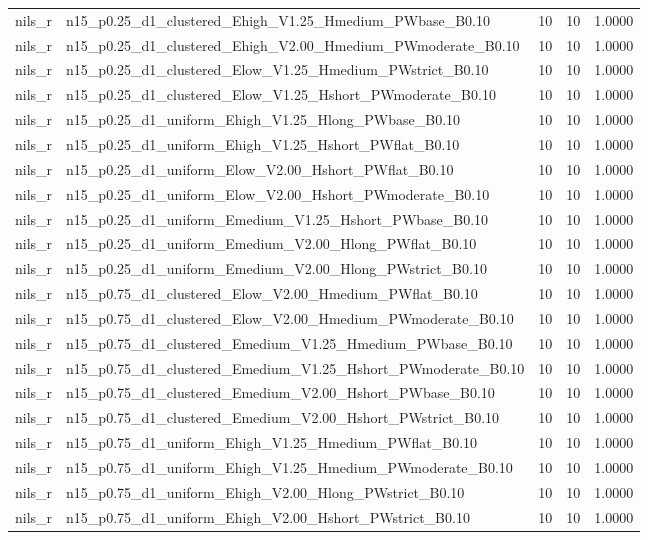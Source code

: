 \begin{tabular}{llrrr}
nils_r & n15_p0.25_d1_clustered_Ehigh_V1.25_Hmedium_PWbase_B0.10 & 10 & 10 & 1.0000 \\
nils_r & n15_p0.25_d1_clustered_Ehigh_V2.00_Hmedium_PWmoderate_B0.10 & 10 & 10 & 1.0000 \\
nils_r & n15_p0.25_d1_clustered_Elow_V1.25_Hmedium_PWstrict_B0.10 & 10 & 10 & 1.0000 \\
nils_r & n15_p0.25_d1_clustered_Elow_V1.25_Hshort_PWmoderate_B0.10 & 10 & 10 & 1.0000 \\
nils_r & n15_p0.25_d1_uniform_Ehigh_V1.25_Hlong_PWbase_B0.10 & 10 & 10 & 1.0000 \\
nils_r & n15_p0.25_d1_uniform_Ehigh_V1.25_Hshort_PWflat_B0.10 & 10 & 10 & 1.0000 \\
nils_r & n15_p0.25_d1_uniform_Elow_V2.00_Hshort_PWflat_B0.10 & 10 & 10 & 1.0000 \\
nils_r & n15_p0.25_d1_uniform_Elow_V2.00_Hshort_PWmoderate_B0.10 & 10 & 10 & 1.0000 \\
nils_r & n15_p0.25_d1_uniform_Emedium_V1.25_Hshort_PWbase_B0.10 & 10 & 10 & 1.0000 \\
nils_r & n15_p0.25_d1_uniform_Emedium_V2.00_Hlong_PWflat_B0.10 & 10 & 10 & 1.0000 \\
nils_r & n15_p0.25_d1_uniform_Emedium_V2.00_Hlong_PWstrict_B0.10 & 10 & 10 & 1.0000 \\
nils_r & n15_p0.75_d1_clustered_Elow_V2.00_Hmedium_PWflat_B0.10 & 10 & 10 & 1.0000 \\
nils_r & n15_p0.75_d1_clustered_Elow_V2.00_Hmedium_PWmoderate_B0.10 & 10 & 10 & 1.0000 \\
nils_r & n15_p0.75_d1_clustered_Emedium_V1.25_Hmedium_PWbase_B0.10 & 10 & 10 & 1.0000 \\
nils_r & n15_p0.75_d1_clustered_Emedium_V1.25_Hshort_PWmoderate_B0.10 & 10 & 10 & 1.0000 \\
nils_r & n15_p0.75_d1_clustered_Emedium_V2.00_Hshort_PWbase_B0.10 & 10 & 10 & 1.0000 \\
nils_r & n15_p0.75_d1_clustered_Emedium_V2.00_Hshort_PWstrict_B0.10 & 10 & 10 & 1.0000 \\
nils_r & n15_p0.75_d1_uniform_Ehigh_V1.25_Hmedium_PWflat_B0.10 & 10 & 10 & 1.0000 \\
nils_r & n15_p0.75_d1_uniform_Ehigh_V1.25_Hmedium_PWmoderate_B0.10 & 10 & 10 & 1.0000 \\
nils_r & n15_p0.75_d1_uniform_Ehigh_V2.00_Hlong_PWstrict_B0.10 & 10 & 10 & 1.0000 \\
nils_r & n15_p0.75_d1_uniform_Ehigh_V2.00_Hshort_PWstrict_B0.10 & 10 & 10 & 1.0000 \\

\end{tabular}
